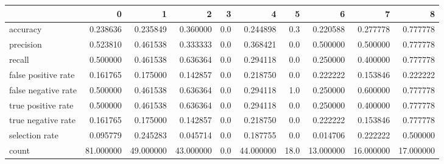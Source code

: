 \begin{tabular}{lrrrrrrrrr}
\toprule
{} &          0 &          1 &          2 &    3 &          4 &     5 &          6 &          7 &          8 \\
\midrule
accuracy            &   0.238636 &   0.235849 &   0.360000 &  0.0 &   0.244898 &   0.3 &   0.220588 &   0.277778 &   0.777778 \\
precision           &   0.523810 &   0.461538 &   0.333333 &  0.0 &   0.368421 &   0.0 &   0.500000 &   0.500000 &   0.777778 \\
recall              &   0.500000 &   0.461538 &   0.636364 &  0.0 &   0.294118 &   0.0 &   0.250000 &   0.400000 &   0.777778 \\
false positive rate &   0.161765 &   0.175000 &   0.142857 &  0.0 &   0.218750 &   0.0 &   0.222222 &   0.153846 &   0.222222 \\
false negative rate &   0.500000 &   0.461538 &   0.636364 &  0.0 &   0.294118 &   1.0 &   0.250000 &   0.600000 &   0.777778 \\
true positive rate  &   0.500000 &   0.461538 &   0.636364 &  0.0 &   0.294118 &   0.0 &   0.250000 &   0.400000 &   0.777778 \\
true negative rate  &   0.161765 &   0.175000 &   0.142857 &  0.0 &   0.218750 &   0.0 &   0.222222 &   0.153846 &   0.777778 \\
selection rate      &   0.095779 &   0.245283 &   0.045714 &  0.0 &   0.187755 &   0.0 &   0.014706 &   0.222222 &   0.500000 \\
count               &  81.000000 &  49.000000 &  43.000000 &  0.0 &  44.000000 &  18.0 &  13.000000 &  16.000000 &  17.000000 \\
\bottomrule
\end{tabular}
